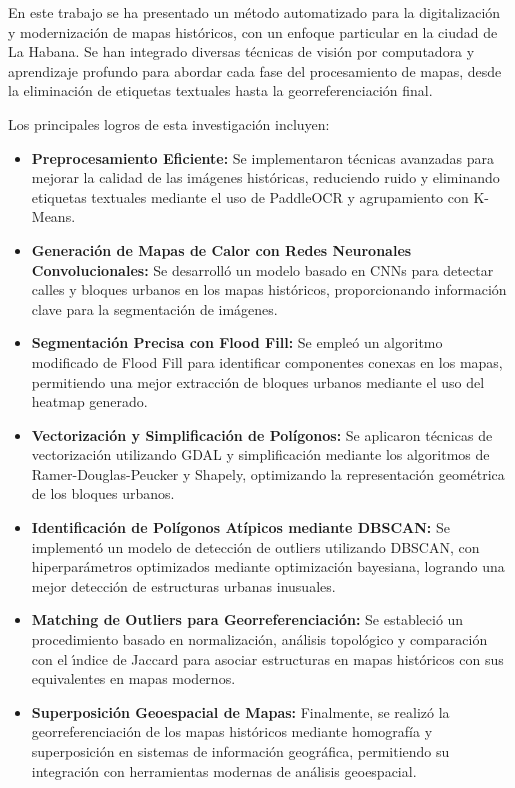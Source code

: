\documentclass[twocolumn, fontsize=10pt]{article}
\begin{document}
En este trabajo se ha presentado un m\'etodo automatizado para la digitalizaci\'on y modernizaci\'on de mapas hist\'oricos, con un enfoque particular en la ciudad de La Habana. Se han integrado diversas t\'ecnicas de visi\'on por computadora y aprendizaje profundo para abordar cada fase del procesamiento de mapas, desde la eliminaci\'on de etiquetas textuales hasta la georreferenciaci\'on final.

Los principales logros de esta investigaci\'on incluyen:

\begin{itemize}
    \item \textbf{Preprocesamiento Eficiente:} Se implementaron t\'ecnicas avanzadas para mejorar la calidad de las im\'agenes hist\'oricas, reduciendo ruido y eliminando etiquetas textuales mediante el uso de PaddleOCR y agrupamiento con K-Means.
    \item \textbf{Generaci\'on de Mapas de Calor con Redes Neuronales Convolucionales:} Se desarroll\'o un modelo basado en CNNs para detectar calles y bloques urbanos en los mapas hist\'oricos, proporcionando informaci\'on clave para la segmentaci\'on de im\'agenes.
    \item \textbf{Segmentaci\'on Precisa con Flood Fill:} Se emple\'o un algoritmo modificado de Flood Fill para identificar componentes conexas en los mapas, permitiendo una mejor extracci\'on de bloques urbanos mediante el uso del heatmap generado.
    \item \textbf{Vectorizaci\'on y Simplificaci\'on de Pol\'igonos:} Se aplicaron t\'ecnicas de vectorizaci\'on utilizando GDAL y simplificaci\'on mediante los algoritmos de Ramer-Douglas-Peucker y Shapely, optimizando la representaci\'on geom\'etrica de los bloques urbanos.
    \item \textbf{Identificaci\'on de Pol\'igonos At\'ipicos mediante DBSCAN:} Se implement\'o un modelo de detecci\'on de outliers utilizando DBSCAN, con hiperpar\'ametros optimizados mediante optimizaci\'on bayesiana, logrando una mejor detecci\'on de estructuras urbanas inusuales.
    \item \textbf{Matching de Outliers para Georreferenciaci\'on:} Se estableci\'o un procedimiento basado en normalizaci\'on, an\'alisis topol\'ogico y comparaci\'on con el \'{\i}ndice de Jaccard para asociar estructuras en mapas hist\'oricos con sus equivalentes en mapas modernos.
    \item \textbf{Superposici\'on Geoespacial de Mapas:} Finalmente, se realiz\'o la georreferenciaci\'on de los mapas hist\'oricos mediante homograf\'ia y superposici\'on en sistemas de informaci\'on geogr\'afica, permitiendo su integraci\'on con herramientas modernas de an\'alisis geoespacial.
\end{itemize}
\end{document}
